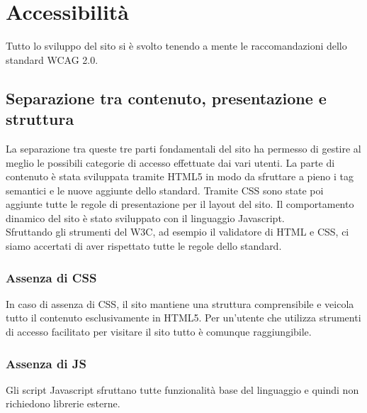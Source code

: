 \section{Accessibilità}
Tutto lo sviluppo del sito si è svolto tenendo a mente le raccomandazioni dello standard WCAG 2.0.

\subsection{Separazione tra contenuto, presentazione e struttura}
La separazione tra queste tre parti fondamentali del sito ha permesso di gestire al meglio le possibili categorie di accesso effettuate dai vari utenti. La parte di contenuto è stata sviluppata tramite HTML5 in modo da sfruttare a pieno i tag semantici e le nuove aggiunte dello standard. Tramite CSS sono state poi aggiunte tutte le regole di presentazione per il layout del sito. Il comportamento dinamico del sito è stato sviluppato con il linguaggio Javascript.\\ Sfruttando gli strumenti del W3C, ad esempio il validatore di HTML e CSS, ci siamo accertati di aver rispettato tutte le regole dello standard.

\subsubsection{Assenza di CSS}
In caso di assenza di CSS, il sito mantiene una struttura comprensibile e veicola tutto il contenuto esclusivamente in HTML5. Per un'utente che utilizza strumenti di accesso facilitato per visitare il sito tutto è comunque raggiungibile.

\subsubsection{Assenza di JS}
Gli script Javascript sfruttano tutte funzionalità base del linguaggio e quindi non richiedono librerie esterne.

